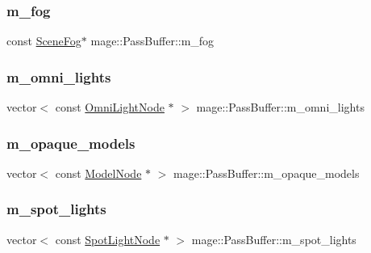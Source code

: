 \subsubsection{\texorpdfstring{m\+\_\+fog}{m\_fog}}
{\footnotesize\ttfamily const \hyperlink{structmage_1_1_scene_fog}{Scene\+Fog}$\ast$ mage\+::\+Pass\+Buffer\+::m\+\_\+fog}

\hypertarget{structmage_1_1_pass_buffer_ab4553bc8afe80eff1f52d511cd23e90b}{}\label{structmage_1_1_pass_buffer_ab4553bc8afe80eff1f52d511cd23e90b} 
\subsubsection{\texorpdfstring{m\+\_\+omni\+\_\+lights}{m\_omni\_lights}}
{\footnotesize\ttfamily vector$<$ const \hyperlink{namespacemage_a1724c6e6b6b5ba535cdd967cbbb4a669}{Omni\+Light\+Node} $\ast$ $>$ mage\+::\+Pass\+Buffer\+::m\+\_\+omni\+\_\+lights}

\hypertarget{structmage_1_1_pass_buffer_a9084c0099c1327ba104081305e40fdbe}{}\label{structmage_1_1_pass_buffer_a9084c0099c1327ba104081305e40fdbe} 
\subsubsection{\texorpdfstring{m\+\_\+opaque\+\_\+models}{m\_opaque\_models}}
{\footnotesize\ttfamily vector$<$ const \hyperlink{classmage_1_1_model_node}{Model\+Node} $\ast$ $>$ mage\+::\+Pass\+Buffer\+::m\+\_\+opaque\+\_\+models}

\hypertarget{structmage_1_1_pass_buffer_a45b9dd8e0ecb9c0110b53a5a744519bb}{}\label{structmage_1_1_pass_buffer_a45b9dd8e0ecb9c0110b53a5a744519bb} 
\subsubsection{\texorpdfstring{m\+\_\+spot\+\_\+lights}{m\_spot\_lights}}
{\footnotesize\ttfamily vector$<$ const \hyperlink{namespacemage_aeed5dee4ff6c591eabb0e9114256df4a}{Spot\+Light\+Node} $\ast$ $>$ mage\+::\+Pass\+Buffer\+::m\+\_\+spot\+\_\+lights}

